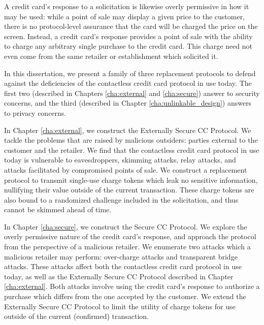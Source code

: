 A credit card's response to a solicitation is likewise overly permissive in how it may be used:
    while a point of sale may display a given price to the customer, there is no protocol-level assurance that the card will be charged the price on the screen.
Instead, a credit card's response provides a point of sale with the ability to charge any arbitrary single purchase to the credit card.
This charge need not even come from the same retailer or establishment which solicited it.

In this dissertation, we present a family of three replacement protocols to defend against the deficiencies of the contactless credit card protocol in use today.
The first two (described in Chapters \ref{cha:external} and \ref{cha:secure}) answer to security concerns, and the third (described in Chapter \ref{cha:unlinkable_design}) answers to privacy concerns.

In Chapter \ref{cha:external}, we construct the Externally Secure CC Protocol.
We tackle the problems that are raised by malicious outsiders: parties external to the customer and the retailer.
We find that the contactless credit card protocol in use today is vulnerable to eavesdroppers, skimming attacks, relay attacks, and attacks facilitated by compromised points of sale.
We construct a replacement protocol to transmit single-use charge tokens which leak no sensitive information, nullifying their value outside of the current transaction.
These charge tokens are also bound to a randomized challenge included in the solicitation, and thus cannot be skimmed ahead of time.

In Chapter \ref{cha:secure}, we construct the Secure CC Protocol.
We explore the overly permissive nature of the credit card's response, and approach the protocol from the perspective of a malicious retailer.
We enumerate two attacks which a malicious retailer may perform: over-charge attacks and transparent bridge attacks.
These attacks affect both the contactless credit card protocol in use today, as well as the Externally Secure CC Protocol described in Chapter \ref{cha:external}.
Both attacks involve using the credit card's response to authorize a purchase which differs from the one accepted by the customer.
We extend the Externally Secure CC Protocol to limit the utility of charge tokens for use outside of the current (confirmed) transaction.
